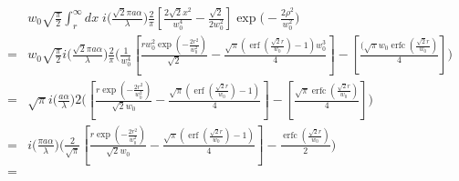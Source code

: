 \documentclass[aps,twoside,secnumarabic,balancelastpage,amsmath,amssymb,nofootinbib,hyperref=pdftex]{revtex4}
\begin{document}
\begin{align*}
&w_0 \sqrt{ \frac{\pi}{2} }   \int_{r}^{\infty} dx \;
            			i  
				\big( \frac{\sqrt{2} \pi a \alpha}{ \lambda} \big)
                \frac{2}{\pi}
                \left[
                    \frac{2 \sqrt{2} x^2}{w_0^4}
                    -
                    \frac{\sqrt{2}}{2 w_0^2}
                \right]
                \exp \big( - \frac{2 \rho^2}{w_0^2} \big)
            \\=&   
    w_0 \sqrt{ \frac{\pi}{2} }
            			i  
				\big( \frac{\sqrt{2} \pi a \alpha}{ \lambda} \big)
                \frac{2}{\pi}
                \Bigg(
                    \frac{1}{w_0^4}
                		\left[
                        	\frac{rw_0^2 \exp({-\frac{2r^2}{w_0^2}})}{\sqrt{2}}
                        	-\frac{\sqrt{{\pi}}\left(
                        	\operatorname{erf}\left(\frac{\sqrt{2}r}{w_0}\right)-1\right)w_0^3}{4}
                    	\right]-
                    	\left[
                    	\frac{
							(\sqrt{\pi} w_0
							\operatorname{erfc}(\frac{\sqrt{2} r}{w_0})
							}
							{
							4 
							}
                     	\right]
                \Bigg)
      \\=&
     \sqrt{ {\pi} }
            			i  
				\big( \frac{ a \alpha}{ \lambda} \big)
                2
                \Bigg(
                		\left[
                        	\frac
                        	{r \exp({-\frac{2r^2}{w_0^2}})}
                        	{\sqrt{2} w_0}
                        	-\frac{\sqrt{{\pi}}\left(
                        	\operatorname{erf}\left(\frac{\sqrt{2}r}{w_0}\right)-1\right)}{4}
                    	\right]
                   -
                    	\left[
                    	\frac{
							\sqrt{\pi}
							\operatorname{erfc}(\frac{\sqrt{2} r}{w_0})
							}
							{
							4 
							}
                     	\right]
                \Bigg)
         \\=&
            			i  
				\big( \frac{\pi a \alpha}{ \lambda} \big)
                \Bigg(
                    \frac{2}{ \sqrt{\pi}}
                		\left[
                        	\frac
                        	{r \exp({-\frac{2r^2}{w_0^2}})}
                        	{\sqrt{2} w_0}
                        	-\frac{\sqrt{{\pi}}\left(
                        	\operatorname{erf}\left(\frac{\sqrt{2}r}{w_0}\right)-1\right)}{4}
                    	\right]-
                    	\frac{
							\operatorname{erfc}( \frac{\sqrt{2} r}{w_0})
							}
							{
							2 
							}
                \Bigg)
           \\=&

\end{align*}
\end{document}
